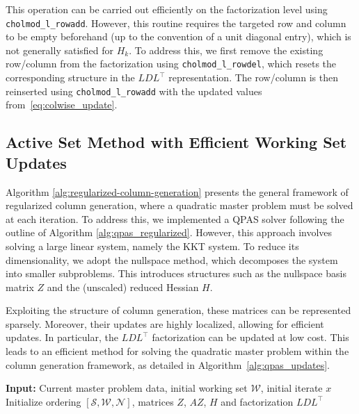 \documentclass{book}
\theoremstyle{definition}
\newcounter{algorithm_}
\numberwithin{algorithm_}{chapter}
\begin{document}
{\bigskip

This operation can be carried out efficiently on the factorization level using \texttt{cholmod\_l\_rowadd}. However, this routine requires the targeted row and column to be empty beforehand (up to the convention of a unit diagonal entry), which is not generally satisfied for \(H_k\). To address this, we first remove the existing row/column from the factorization using \texttt{cholmod\_l\_rowdel}, which resets the corresponding structure in the \(LDL^\top\) representation. The row/column is then reinserted using \texttt{cholmod\_l\_rowadd} with the updated values from~\eqref{eq:colwise_update}.

\newpage

\subsection{Active Set Method with Efficient Working Set Updates}

Algorithm \ref{alg:regularized-column-generation} presents the general framework of regularized column generation, where a quadratic master problem must be solved at each iteration. To address this, we implemented a QPAS solver following the outline of Algorithm \ref{alg:qpas_regularized}. However, this approach involves solving a large linear system, namely the KKT system. To reduce its dimensionality, we adopt the nullspace method, which decomposes the system into smaller subproblems. This introduces structures such as the nullspace basis matrix $Z$ and the (unscaled) reduced Hessian $H$.


Exploiting the structure of column generation, these matrices can be represented sparsely. Moreover, their updates are highly localized, allowing for efficient updates. In particular, the $LDL^\top$ factorization can be updated at low cost. This leads to an efficient method for solving the quadratic master problem within the column generation framework, as detailed in Algorithm~\ref{alg:qpas_updates}.

\medskip

\begin{tcolorbox}[colback=gray!10!white, colframe=gray!80!black,
                  title=Algorithm 4.3: Active Set Method with Efficient Working Set Updates, sharp corners, boxrule=0.8pt]
{\small
\begin{algorithmic}[1]
\State \textbf{Input:} Current master problem data, initial working set $\mathcal{W}$, initial iterate $x$
\medskip
\State Initialize ordering $[\mathcal{S}, \mathcal{W}, \mathcal{N}]$, matrices $Z$, $AZ$, $H$ and factorization $LDL^\top$


\end{algorithmic}}
\end{tcolorbox}}
\end{document}
